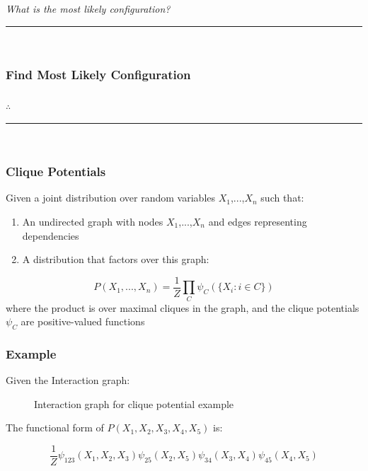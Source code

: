 \documentclass{article}
\begin{document}
\begin{flushleft}
    \textit{What is the most likely configuration?}
\end{flushleft}

\noindent\rule{\textwidth}{0.4pt}\\

\subsubsection*{Find Most Likely Configuration}

\subsubsection*{\normalfont}{$\therefore$ }

\noindent\rule{\textwidth}{0.4pt}\\

\subsubsection{Clique Potentials}
\begin{flushleft}
    Given a joint distribution over random variables $X_1$,...,$X_n$ such that:
    \begin{enumerate}
        \item An undirected graph with nodes $X_1$,...,$X_n$ and edges representing dependencies
        \item A distribution that factors over this graph:
    \end{enumerate}
    $$
    P(X_1,...,X_n) = \frac{1}{Z} \prod_{C} \psi_C (\{ X_i:i\in C\})
    $$
    where the product is over maximal cliques in the graph, and the clique potentials $\psi_C$ are positive-valued functions
\end{flushleft}

\subsubsection*{Example}
\begin{flushleft}
    Given the Interaction graph:
\end{flushleft}
\begin{figure}[h!]
\centering
\caption{Interaction graph for clique potential example}
\label{fig:clique_ex}
\end{figure}
\begin{flushleft}
    The functional form of $P(X_1,X_2,X_3,X_4,X_5)$ is: 
\end{flushleft}
$$
\frac{1}{Z}\psi_{123}(X_1,X_2,X_3)\psi_{25}(X_2,X_5)\psi_{34}(X_3,X_4)\psi_{45}(X_4,X_5)
$$
\end{document}
